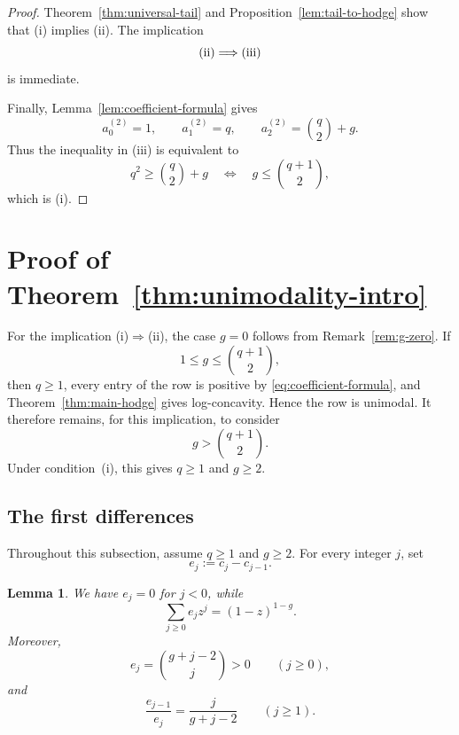 \documentclass[12pt]{amsart}
\theoremstyle{plain}
\newtheorem{lemma}[theorem]{Lemma}
\theoremstyle{definition}
\theoremstyle{remark}
\begin{document}
\begin{proof}
Theorem~\ref{thm:universal-tail} and
Proposition~\ref{lem:tail-to-hodge} show that
\textup{(i)} implies \textup{(ii)}.  The implication
\[
 \textup{(ii)}\Longrightarrow\textup{(iii)}
\]
is immediate.

Finally, Lemma~\ref{lem:coefficient-formula} gives
\[
 a_0^{(2)}=1,\qquad
 a_1^{(2)}=q,\qquad
 a_2^{(2)}=\binom q2+g.
\]
Thus the inequality in \textup{(iii)} is equivalent to
\[
 q^2\ge\binom q2+g
 \quad\Longleftrightarrow\quad
 g\le\binom{q+1}{2},
\]
which is \textup{(i)}.
\end{proof}

\section{Proof of Theorem~\ref{thm:unimodality-intro}}
\label{sec:unimodality}

For the implication \textup{(i)}\(\Rightarrow\)\textup{(ii)}, the case
\(g=0\) follows from Remark~\ref{rem:g-zero}.  If
\[
 1\le g\le\binom{q+1}{2},
\]
then \(q\ge1\), every entry of the row is positive by
\eqref{eq:coefficient-formula}, and Theorem~\ref{thm:main-hodge} gives
log-concavity.  Hence the row is unimodal.  It therefore remains, for
this implication, to consider
\[
 g>\binom{q+1}{2}.
\]
Under condition~\textup{(i)}, this gives \(q\ge1\) and \(g\ge2\).

\subsection{The first differences}

Throughout this subsection, assume \(q\ge1\) and \(g\ge2\).  For every
integer \(j\), set
\begin{equation}\label{eq:e-definition}
 e_j:=c_j-c_{j-1}.
\end{equation}

\begin{lemma}\label{lem:e-properties}
We have \(e_j=0\) for \(j<0\), while
\begin{equation}\label{eq:e-generating}
 \sum_{j\ge0}e_jz^j=(1-z)^{1-g}.
\end{equation}
Moreover,
\begin{equation}\label{eq:e-binomial}
 e_j=\binom{g+j-2}{j}>0
 \qquad(j\ge0),
\end{equation}
and
\begin{equation}\label{eq:e-ratio}
 \frac{e_{j-1}}{e_j}
 =\frac{j}{g+j-2}
 \qquad(j\ge1).
\end{equation}
\end{lemma}
\end{document}

